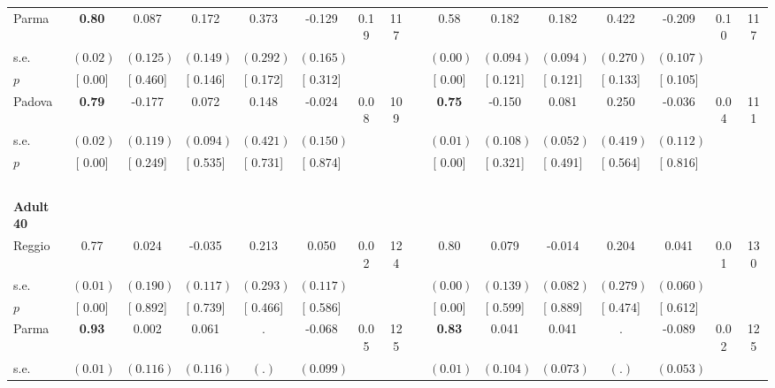 \begin{longtable}{L{8em} c c c c c c c p{1em} c c c c c c c}
\quad \quad \quad Parma& \textbf{     0.80} &     0.087 &     0.172 &     0.373 &    -0.129 &      0.19 &       117 & & 0.58 &     0.182 &     0.182 &     0.422 &    -0.209 &      0.10 &       117  \\*
\quad \quad \quad \quad s.e.& $ (     0.02)$ & $ (    0.125)$ & $ (    0.149)$ & $ (    0.292)$ & $ (    0.165)$ & & & & $ (     0.00)$ & $ (    0.094)$ & $ (    0.094)$ & $ (    0.270)$ & $ (    0.107)$ & &  \\*
\quad \quad \quad \quad $ p$ & [     0.00] & [    0.460] & [    0.146] & [    0.172] & [    0.312] & & & & [     0.00] & [    0.121] & [    0.121] & [    0.133] & [    0.105] & &  \\[1em]
\quad \quad \quad Padova& \textbf{     0.79} &    -0.177 &     0.072 &     0.148 &    -0.024 &      0.08 &       109 & & \textbf{     0.75} &    -0.150 &     0.081 &     0.250 &    -0.036 &      0.04 &       111  \\*
\quad \quad \quad \quad s.e.& $ (     0.02)$ & $ (    0.119)$ & $ (    0.094)$ & $ (    0.421)$ & $ (    0.150)$ & & & & $ (     0.01)$ & $ (    0.108)$ & $ (    0.052)$ & $ (    0.419)$ & $ (    0.112)$ & &  \\*
\quad \quad \quad \quad $ p$ & [     0.00] & [    0.249] & [    0.535] & [    0.731] & [    0.874] & & & & [     0.00] & [    0.321] & [    0.491] & [    0.564] & [    0.816] & &  \\[1em]
~\\[1em]
\quad \quad \textbf{Adult 40} & & & & & & & & & & & & & & & \\* 
\quad \quad \quad Reggio& 0.77 &     0.024 &    -0.035 &     0.213 &     0.050 &      0.02 &       124 & & 0.80 &     0.079 &    -0.014 &     0.204 &     0.041 &      0.01 &       130  \\*
\quad \quad \quad \quad s.e.& $ (     0.01)$ & $ (    0.190)$ & $ (    0.117)$ & $ (    0.293)$ & $ (    0.117)$ & & & & $ (     0.00)$ & $ (    0.139)$ & $ (    0.082)$ & $ (    0.279)$ & $ (    0.060)$ & &  \\*
\quad \quad \quad \quad $ p$ & [     0.00] & [    0.892] & [    0.739] & [    0.466] & [    0.586] & & & & [     0.00] & [    0.599] & [    0.889] & [    0.474] & [    0.612] & &  \\[1em]
\quad \quad \quad Parma& \textbf{     0.93} &     0.002 &     0.061 &         . &    -0.068 &      0.05 &       125 & & \textbf{     0.83} &     0.041 &     0.041 &         . &    -0.089 &      0.02 &       125  \\*
\quad \quad \quad \quad s.e.& $ (     0.01)$ & $ (    0.116)$ & $ (    0.116)$ & $ (        .)$ & $ (    0.099)$ & & & & $ (     0.01)$ & $ (    0.104)$ & $ (    0.073)$ & $ (        .)$ & $ (    0.053)$ & &  \\*

\end{longtable}
